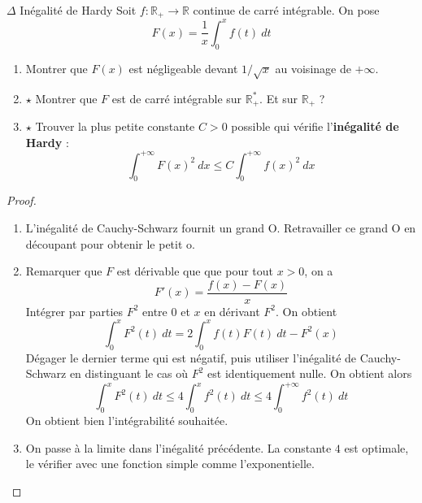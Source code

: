 \documentclass[french,a4paper]{article}
\newcommand{\R}{\mathbb{R}}
\newcommand{\st}{^*}
\theoremstyle{plain}
\theoremstyle{definition}
\theoremstyle{remark}
\begin{document}
\begin{ex}[Moulin.IG.42]{$\Delta$ Inégalité de Hardy}
	Soit $f:\R_+\to\R$ continue de carré intégrable. On pose $$F(x)=\frac{1}{x}\int_{0}^{x}f(t)\ dt$$
	\begin{enumerate}
		\item Montrer que $F(x)$ est négligeable devant $1/\sqrt{x}$ au voisinage de $+\infty$.
		\item $\star$ Montrer que $F$ est de carré intégrable sur $\R_+\st$. Et sur $\R_+$ ?
		\item $\star$ Trouver la plus petite constante $C>0$ possible qui vérifie l'\textbf{inégalité de Hardy} : $$\int_{0}^{+\infty}F(x)^2\ dx\leqslant C\int_{0}^{+\infty}f(x)^2\ dx$$
	\end{enumerate}
\end{ex}
\begin{proof}
	\begin{enumerate}
		\item L'inégalité de Cauchy-Schwarz fournit un grand O. Retravailler ce grand O en découpant pour obtenir le petit o.
		\item Remarquer que $F$ est dérivable que que pour tout $x>0$, on a $$F'(x)=\frac{f(x)-F(x)}{x}$$ Intégrer par parties $F^2$ entre $0$ et $x$ en dérivant $F^2$. On obtient $$\int_{0}^{x}F^2(t)\ dt=2\int_{0}^{x}f(t)F(t)\ dt-F^2(x)$$ Dégager le dernier terme qui est négatif, puis utiliser l'inégalité de Cauchy-Schwarz en distinguant le cas où $F^2$ est identiquement nulle. On obtient alors $$\int_{0}^{x}F^2(t)\ dt\leqslant4\int_{0}^{x}f^2(t)\ dt\leqslant4\int_{0}^{+\infty}f^2(t)\ dt$$ On obtient bien l'intégrabilité souhaitée.
		\item On passe à la limite dans l'inégalité précédente. La constante $4$ est optimale, le vérifier avec une fonction simple comme l'exponentielle.
	\end{enumerate}
\end{proof}
\end{document}
